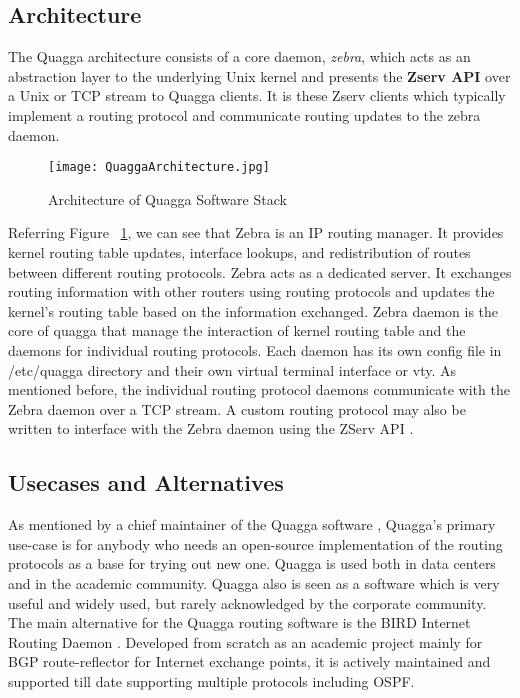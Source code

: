 \documentclass{article}
\begin{document}
\subsection{Architecture}
The Quagga architecture consists of a core daemon, \textit{zebra}, which acts as an abstraction 
layer to the underlying Unix kernel and presents the \textbf{Zserv API} over a Unix or TCP stream 
to Quagga clients. It is these Zserv clients which typically implement a routing protocol 
and communicate routing updates to the zebra daemon.\cite{quaggaofficial} \\
\begin{figure}[ht!]
  \centering
  \texttt{[image: QuaggaArchitecture.jpg]}
  \caption{Architecture of Quagga Software Stack}
  \label{fig:quaggaarchitecture}
\end{figure}
Referring Figure~ \ref{fig:quaggaarchitecture}, we can see that Zebra is an IP routing manager. 
It provides kernel routing table updates, interface lookups, and redistribution of routes between 
different routing protocols. Zebra acts as a dedicated server. It exchanges routing information with 
other routers using routing protocols and updates the kernel’s routing table based on the information exchanged.
Zebra daemon is the core of quagga that manage the interaction of kernel routing table and the daemons for 
individual routing protocols. Each daemon has its own config file in /etc/quagga directory and their own 
virtual terminal interface or vty. As mentioned before, the individual routing protocol daemons communicate 
with the Zebra daemon over a TCP stream. A custom routing protocol may also be written to interface with the
Zebra daemon using the ZServ API \cite{zservdocs}.

\subsection{Usecases and Alternatives}
As mentioned by a chief maintainer of the Quagga software \cite{martininterview}, Quagga's
primary use-case is for anybody who needs an open-source implementation of the routing protocols
as a base for trying out new one. Quagga is used both in data centers and in the academic community. 
Quagga also is seen as a software which is very useful and widely used, but rarely acknowledged by the corporate community.\\
The main alternative for the Quagga routing software is the BIRD Internet Routing Daemon \cite{bird}.
Developed from scratch as an academic project mainly for BGP route-reflector for Internet exchange points, 
it is actively maintained and supported till date supporting multiple protocols including OSPF.
\end{document}
